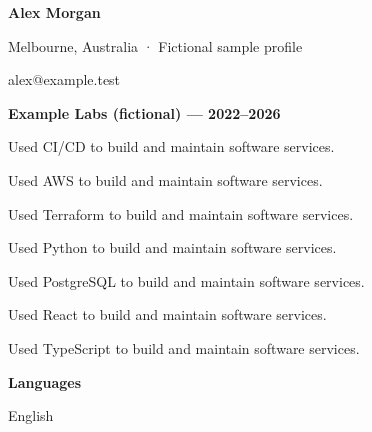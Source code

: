 \documentclass[10pt,a4paper]{article}
\begin{document}
{\LARGE\bfseries\color{navy} Alex Morgan}\par
Melbourne, Australia · Fictional sample profile\par
alex@example.test\par
{\large\bfseries\color{navy} Example Labs (fictional) — 2022–2026}\par
Used CI/CD to build and maintain software services.\par
Used AWS to build and maintain software services.\par
Used Terraform to build and maintain software services.\par
Used Python to build and maintain software services.\par
Used PostgreSQL to build and maintain software services.\par
Used React to build and maintain software services.\par
Used TypeScript to build and maintain software services.\par
{\large\bfseries\color{navy} Languages}\par
English\par
\end{document}
